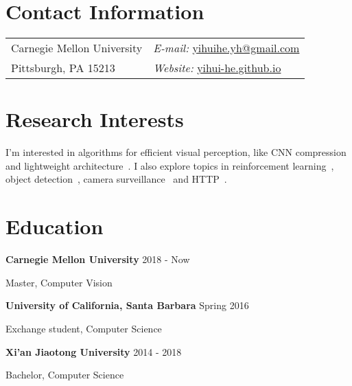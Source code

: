 \documentclass[margin,line]{res}
\newenvironment{list1}{
  \begin{list}{\ding{113}}{%
      \setlength{\itemsep}{0in}
      \setlength{\parsep}{0in} \setlength{\parskip}{0in}
      \setlength{\topsep}{0in} \setlength{\partopsep}{0in} 
      \setlength{\leftmargin}{0.17in}}}{\end{list}}
\begin{document}
\nocite{*}


\begin{resume}
\section{\sc Contact Information}
\vspace{.05in}
\begin{tabular}{@{}p{2in}p{4in}}        
Carnegie Mellon University & {\it E-mail:}  
\href{mailto:yihuihe.yh@gmail.com}{yihuihe.yh@gmail.com}\\       
Pittsburgh, PA 15213  & {\it Website:} 
\href{http://yihui-he.github.io/}{yihui-he.github.io} \\     
\end{tabular}


\section{\sc Research Interests}
I'm interested in algorithms for efficient visual perception, like CNN compression~\cite{He_2017_ICCV,adc,tpami} and lightweight architecture~\cite{liang2017single}.
I also explore topics in reinforcement learning~\cite{adc}, object detection~\cite{He_2017_ICCV}, camera surveillance~\cite{ma2017vehicle} and HTTP~\cite{pid}.
\section{\sc Education}
{\bf Carnegie Mellon University} \hfill {2018 - Now}\\
\vspace*{-.1in}
\begin{list1}
\item[] Master, Computer Vision
\end{list1}

{\bf University of California, Santa Barbara} \hfill {Spring 2016}\\
\vspace*{-.1in}
\begin{list1}
\item[] Exchange student, Computer Science %
\end{list1}

{\bf Xi'an Jiaotong University} \hfill {2014 - 2018}\\
\vspace*{-.1in}
\begin{list1}
\item[] Bachelor, Computer Science %
\end{list1}




\end{resume}
\end{document}
